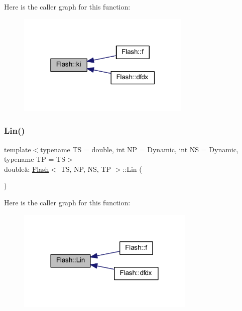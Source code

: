Here is the caller graph for this function\+:
\nopagebreak
\begin{figure}[H]
\begin{center}
\leavevmode
\includegraphics[width=235pt]{class_flash_a5ae7d29d13281fafa84cc9c247461fda_icgraph}
\end{center}
\end{figure}
\mbox{\label{class_flash_a8bfde1e00ab93b6a9b07deead0d3525a}} 
\subsubsection{\texorpdfstring{Lin()}{Lin()}}
{\footnotesize\ttfamily template$<$typename TS = double, int NP = Dynamic, int NS = Dynamic, typename TP = TS$>$ \\
double\& \mbox{\hyperlink{class_flash}{Flash}}$<$ TS, NP, NS, TP $>$\+::Lin (\begin{DoxyParamCaption}{ }\end{DoxyParamCaption})\hspace{0.3cm}{\ttfamily [inline]}}

Here is the caller graph for this function\+:
\nopagebreak
\begin{figure}[H]
\begin{center}
\leavevmode
\includegraphics[width=240pt]{class_flash_a8bfde1e00ab93b6a9b07deead0d3525a_icgraph}
\end{center}
\end{figure}
\mbox{\label{class_flash_a74418fb8dbfaf3f5e8f99d53393f6419}} 
